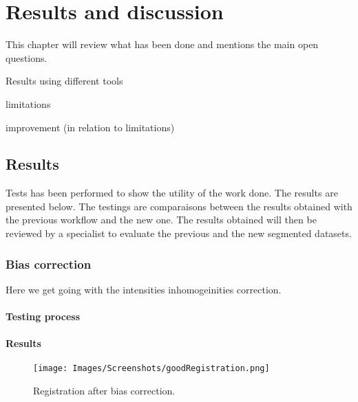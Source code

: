 \chapter{Results and discussion}\label{sec:results}
This chapter will review what has been done and
mentions the main open questions.
\par
Results using different tools
\par
limitations
\par
improvement (in relation to limitations)
%
\section{Results}
%
Tests has been performed to show the utility of the work done. The results are presented below. The testings are comparaisons between the results obtained with the previous workflow and the new one. The results obtained will then be reviewed by a specialist to evaluate the previous and the new segmented datasets.
%
\subsection{Bias correction}
%
Here we get going with the intensities inhomogeinities correction.
%
\subsubsection{Testing process}
%
%



%
\subsubsection{Results}
%
%
\par
\begin{figure}\centering
  \texttt{[image: Images/Screenshots/goodRegistration.png]}
  \caption{Registration after bias correction.}\label{fig:goodRegistration}
\end{figure}
%
\par
%
